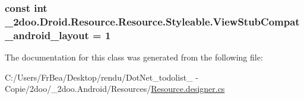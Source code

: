 \hypertarget{class__2doo_1_1_droid_1_1_resource_1_1_styleable_f1a11f917efa817fb73164a261a9f56e}{
\subsubsection[{ViewStubCompat\_\-android\_\-layout}]{\setlength{\rightskip}{0pt plus 5cm}const int \_\-2doo.Droid.Resource.Resource.Styleable.ViewStubCompat\_\-android\_\-layout = 1}}
\label{class__2doo_1_1_droid_1_1_resource_1_1_styleable_f1a11f917efa817fb73164a261a9f56e}




The documentation for this class was generated from the following file:\begin{CompactItemize}
\item 
C:/Users/FrBea/Desktop/rendu/DotNet\_\-todolist\_ - Copie/2doo/\_\-2doo.Android/Resources/\hyperlink{_resource_8designer_8cs}{Resource.designer.cs}\end{CompactItemize}

